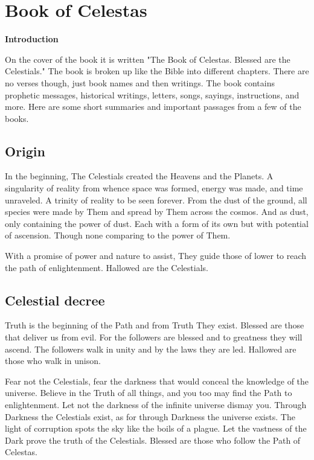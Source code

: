 \section{Book of Celestas}

\begin{center}
	\textbf{Introduction}
\end{center}

On the cover of the book it is written "The Book of Celestas. Blessed are the Celestials." The book is broken up like the Bible into different chapters. There are no verses though, just book names and then writings. The book contains prophetic messages, historical writings, letters, songs, sayings, instructions, and more. Here are some short summaries and important passages from a few of the books.

\subsection{Origin}

In the beginning, The Celestials created the Heavens and the Planets. A singularity of reality from whence space was formed, energy was made, and time unraveled. A trinity of reality to be seen forever. From the dust of the ground, all species were made by Them and spread by Them across the cosmos. And as dust, only containing the power of dust. Each with a form of its own but with potential of ascension. Though none comparing to the power of Them.

With a promise of power and nature to assist, They guide those of lower to reach the path of enlightenment. Hallowed are the Celestials.

\subsection{Celestial decree}

Truth is the beginning of the Path and from Truth They exist. Blessed are those that deliver us from evil. For the followers are blessed and to greatness they will ascend. The followers walk in unity and by the laws they are led. Hallowed are those who walk in unison. 

Fear not the Celestials, fear the darkness that would conceal the knowledge of the universe. Believe in the Truth of all things, and you too may find the Path to enlightenment. Let not the darkness of the infinite universe dismay you. Through Darkness the Celestials exist, as for through Darkness the universe exists. The light of corruption spots the sky like the boils of a plague. Let the vastness of the Dark prove the truth of the Celestials. Blessed are those who follow the Path of Celestas. 

